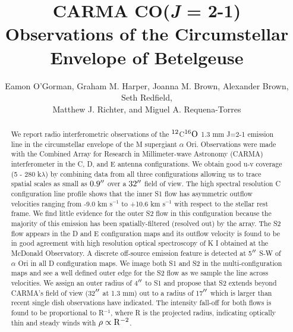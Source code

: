\documentclass[iop]{emulateapj}
\begin{document}
\title{CARMA CO(\textit{J} = 2-1) Observations of the Circumstellar Envelope of Betelgeuse}


\author{Eamon O'Gorman, Graham M. Harper, Joanna M. Brown, Alexander Brown, Seth Redfield,\\ Matthew J. Richter, and Miguel A. Requena-Torres}


\begin{abstract}
We report radio interferometric observations of the $\rm{{}^{12}}$C$\rm{{}^{16}}O$ 1.3 mm J=2-1 emission line in the circumstellar envelope of the M supergiant $\alpha$ Ori.  Observations were made with the Combined Array for Research in Millimeter-wave Astronomy (CARMA) interferometer in the C, D, and E antenna configurations. We obtain good u-v coverage (5 - 280 k$\lambda$) by combining data from all three configurations allowing us to trace spatial scales as small as $0.9\mbox{$^{\prime\prime}$}$ over a $32\mbox{$^{\prime\prime}$}$ field of view. The high spectral resolution C configuration line profile shows that the inner S1 flow has asymmetric outflow velocities ranging from -9.0 km s${}^{-1}$ to +10.6 km s${}^{-1}$ with respect to the stellar rest frame. We find little evidence  for the outer S2 flow in this configuration because the majority of this emission has been spatially-filtered (resolved out) by the array. The S2 flow appears in the D and E configuration maps and its outflow velocity is found to be in good agreement with high resolution optical spectroscopy of K I obtained at the McDonald Observatory. A discrete off-source emission feature is detected at 5$\mbox{$^{\prime\prime}$}$ S-W of  $\alpha$ Ori in all D configuration maps. We image both S1 and S2 in the multi-configuration maps and see a well defined outer edge for the S2 flow as we sample the line across velocities. We assign an outer radius of 4$\mbox{$^{\prime\prime}$}$ to S1 and propose that S2 extends beyond CARMA's field of view (32$\mbox{$^{\prime\prime}$}$ at 1.3 mm) out to a radius of 17$\mbox{$^{\prime\prime}$}$ which is larger than recent single dish observations have indicated. The intensity fall-off for both flows is found to be proportional to R$^{-1}$, where R is the projected radius, indicating optically thin and steady winds with $\rm{\rho \propto R^{-2}}$.
\end{abstract}
\end{document}
